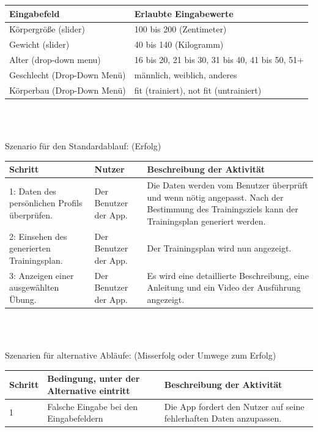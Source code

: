 \documentclass[FIPLY_base.tex]{subfiles}
\begin{document}
	\begin{center}
		\def\arraystretch{1.3}%
		\begin{tabular}{| p{5cm} | p{5cm} |}
			\hline
			\textbf{Eingabefeld} & \textbf{Erlaubte Eingabewerte}
			\\ \hline 
			Körpergröße (slider) & 100 bis 200 (Zentimeter) 
			\\ \hline
			Gewicht (slider) & 40 bis 140 (Kilogramm)
			\\ \hline
			Alter (drop-down menu) & 16 bis 20,
					21 bis 30,
					31 bis 40,
					41 bis 50,
					51+
			\\ \hline
			Geschlecht (Drop-Down Menü) & männlich, weiblich, anderes
			\\ \hline
			Körperbau (Drop-Down Menü) & fit (trainiert), not fit (untrainiert)
			\\ \hline
		\end{tabular} \\
	\end{center}
		\ \\
	Szenario für den Standardablauf: (Erfolg)
	\begin{center}
		\def\arraystretch{1.3}%
		\begin{tabular}{| p{4cm} | p{4cm} | p{4cm} |}
			\hline
			\textbf{Schritt} & \textbf{Nutzer} & 
			\textbf{Beschreibung der Aktivität} 
			\\ \hline 
			1: Daten des persönlichen Profils überprüfen. & Der Benutzer der App. & Die Daten werden vom Benutzer überprüft und wenn nötig angepasst. Nach der Bestimmung des Trainingsziels kann der Trainingsplan generiert werden.
			\\ \hline  
			2: Einsehen des generierten Trainingsplan. & Der Benutzer der App. & Der Trainingsplan wird nun angezeigt. 
			\\ \hline
			3: Anzeigen einer ausgewählten Übung. & Der Benutzer der App. & Es wird eine detaillierte Beschreibung, eine Anleitung und ein Video der Ausführung angezeigt.  \\ \hline
		\end{tabular} \\
	\end{center}
	\ \\
	Szenarien für alternative Abläufe: (Misserfolg oder Umwege zum Erfolg)
		\ \\
	\begin{center}
		\def\arraystretch{1.3}%
		\begin{tabular}{| p{2cm} | p{4cm} | p{4cm} |}
			\hline
			\textbf{Schritt} & \textbf{Bedingung, unter der Alternative eintritt} & \textbf{Beschreibung der Aktivität} 
			\\ \hline 
			1 & Falsche Eingabe bei den Eingabefeldern & Die App fordert den Nutzer auf seine fehlerhaften Daten anzupassen.\\ \hline
		\end{tabular} \\
	\end{center}
\end{document}
